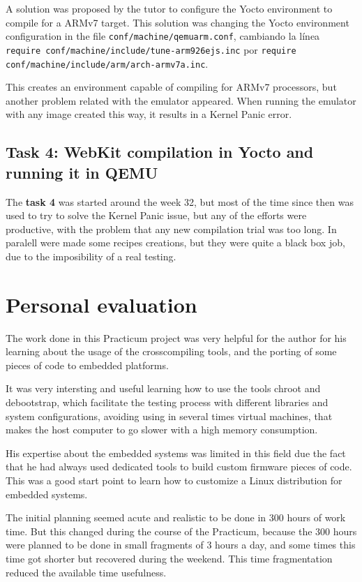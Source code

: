 \documentclass[a4paper,11pt,openany]{report}
\begin{document}
A solution was proposed by the tutor to configure the Yocto environment to compile for a ARMv7 target. This solution was changing the Yocto environment configuration in the file \verb#conf/machine/qemuarm.conf#, cambiando la línea \verb#require conf/machine/include/tune-arm926ejs.inc# por \verb#require conf/machine/include/arm/arch-armv7a.inc#.

This creates an environment capable of compiling for ARMv7 processors, but another problem related with the emulator appeared. When running the emulator with any image created this way, it results in a Kernel Panic error.

\section{Task 4: WebKit compilation in Yocto and running it in QEMU}
The \textbf{task 4} was started around the week 32, but most of the time since then was used to try to solve the Kernel Panic issue, but any of the efforts were productive, with the problem that any new compilation trial was too long. In paralell were made some recipes creations, but they were quite a black box job, due to the imposibility of a real testing.

\chapter{Personal evaluation}
The work done in this Practicum project was very helpful for the author for his learning about the usage of the crosscompiling tools, and the porting of some pieces of code to embedded platforms.

It was very intersting and useful learning how to use the tools chroot and debootstrap, which facilitate the testing process with different libraries and system configurations, avoiding using in several times virtual machines, that makes the host computer to go slower with a high memory consumption.

His expertise about the embedded systems was limited in this field due the fact that he had always used dedicated tools to build custom firmware pieces of code. This was a good start point to learn how to customize a Linux distribution for embedded systems.

The initial planning seemed acute and realistic to be done in 300 hours of work time. But this changed during the course of the Practicum, because the 300 hours were planned to be done in small fragments of 3 hours a day, and some times this time got shorter but recovered during the weekend. This time fragmentation reduced the available time usefulness.
\end{document}
